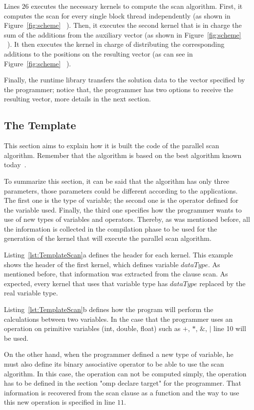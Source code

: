 \documentclass[Ingles]{ic-tese-v1}
\newcommand{\rfig}[1]{Figure~\ref{fig:#1}}
\newcommand{\rlst}[1]{Listing~\ref{lst:#1}}
\begin{document}
Lines $26$ executes the necessary kernels to compute the scan
algorithm. First, it computes the scan for every single block thread
independently (as shown in \rfig{scheme} ~). Then, it executes
the second kernel that is in charge the sum of the additions from the
auxiliary vector (as shown in \rfig{scheme} ~). It then executes
the kernel in charge of distributing the corresponding additions to the
positions on the resulting vector (as can see in \rfig{scheme} ~).

Finally, the runtime library transfers the solution  data to the vector
specified by the programmer; notice that, the programmer has two options to receive the resulting vector, more details in the next section.

\subsection{The Template}
\label{sec:template}

This section aims to explain how it is built the code of the parallel scan
algorithm.  Remember that the algorithm is based on the best algorithm known
today~\cite{Sengupta:2007}.

To summarize this section, it can be said that the algorithm has only three
parameters, those parameters could be different according to the applications.
The first one is the  type of variable; the second one is the operator defined
for the variable used. Finally, the third one specifies how the programmer
wants to  use of new types of variables and operators.
Thereby, as was mentioned before, all the information is collected in the
compilation phase to be used for the generation of the kernel that will execute the parallel
scan algorithm.

\rlst{TemplateScan}{a} defines the header for each kernel. This example shows
the header of the first kernel, which
defines  variable $dataType$. As mentioned before, that information was
extracted from the clause scan. As expected, every kernel that uses 
that variable type has  $dataType$  replaced  by the real variable type.

\rlst{TemplateScan}{b} defines how the program will perform the calculations
between two variables. In the case that the programmer uses an operation on primitive  variables (int, double, float) such as $+$, $*$, $\&$, $|$ line 10 will be used.

On the other hand, when the programmer defined a new type of variable, he must
also define its binary associative operator to be able to use the scan
algorithm. In this case, the operation can not be computed simply, the
operation has to be defined in the section "omp declare target" for the
programmer. That information is recovered from the scan clause as a function
and the way to use this new operation is specified in line $11$.
\end{document}
